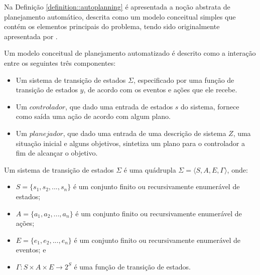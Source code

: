Na Definição \ref{definition::autoplanning} é apresentada a noção abstrata de planejamento automático, descrita como um modelo conceitual simples que contém os elementos principais do problema, tendo sido originalmente apresentada por \cite{GHALLAB20041}.

\vspace{0.2cm}

\begin{definition}{}
\label{definition::autoplanning}
   Um modelo conceitual de planejamento automatizado é descrito como a interação entre os seguintes três componentes:
   
    \begin{itemize}
        \item Um sistema de transição de estados $\Sigma$, especificado por uma função de transição de estados $y$, de acordo com os eventos e ações que ele recebe. 
        \item Um $controlador$, que dado uma entrada de estados $s$ do sistema, fornece como saída uma ação de acordo com algum plano.
        \item Um $planejador$, que dado uma entrada de uma descrição de sistema $Z$, uma situação inicial e alguns objetivos, sintetiza um plano para o controlador a fim de alcançar o objetivo.
    \end{itemize}
    
    Um sistema de transição de estados $\Sigma$ é uma quádrupla $\Sigma = \langle S, A, E, \Gamma \rangle$, onde:
    
    \begin{itemize}
        \item $S = \{s_1, s_2, ..., s_{n}\}$ é um conjunto finito ou recursivamente enumerável de estados;
        \item $A = \{a_1, a_2, ..., a_{n}\}$ é um conjunto finito ou recursivamente enumerável de ações;
        \item $E = \{e_1, e_2, ..., e_{n}\}$ é um conjunto finito ou recursivamente enumerável de eventos; e 
        \item $\Gamma: S \times A \times E \rightarrow 2^S$ é uma função de transição de estados. 
    \end{itemize}
     
\end{definition}


